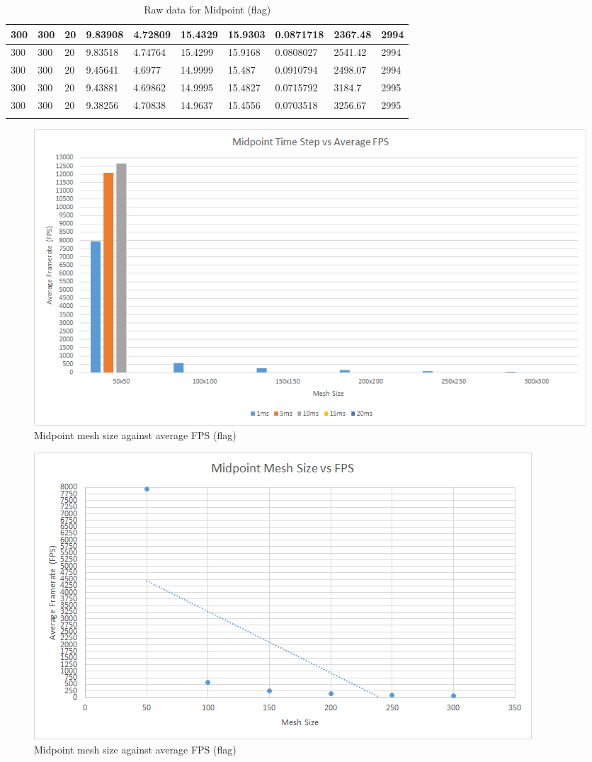 \begin{landscape}
\begin{longtable}{ | l | l | l | l | l | l | l | l | l | l | }
300 & 300 & 20 & 9.83908 & 4.72809 & 15.4329 & 15.9303 & 0.0871718 & 2367.48 & 2994\\ \hline
300 & 300 & 20 & 9.83518 & 4.74764 & 15.4299 & 15.9168 & 0.0808027 & 2541.42 & 2994\\ \hline
300 & 300 & 20 & 9.45641 & 4.6977 & 14.9999 & 15.487 & 0.0910794 & 2498.07 & 2994\\ \hline
300 & 300 & 20 & 9.43881 & 4.69862 & 14.9995 & 15.4827 & 0.0715792 & 3184.7 & 2995\\ \hline
300 & 300 & 20 & 9.38256 & 4.70838 & 14.9637 & 15.4556 & 0.0703518 & 3256.67 & 2995\\ \hline
    \caption{Raw data for Midpoint (flag)}
    \label{tab:m raw flag}
\end{longtable}

    \begin{figure}[!htb]
    \begin{center}
      \includegraphics[scale=0.95]{Figures/flag_m_fps}
    \end{center}
    \caption{Midpoint mesh size against average FPS (flag)}
    \label{fig:m fps flag}
  \end{figure}
\end{landscape}
  
    \begin{figure}
    \begin{center}
      \includegraphics[scale=.9]{Figures/flag_m_m_fps}
    \end{center}
    \caption{Midpoint mesh size against average FPS (flag)}
    \label{fig:m mesh fps flag}
  \end{figure}
  
